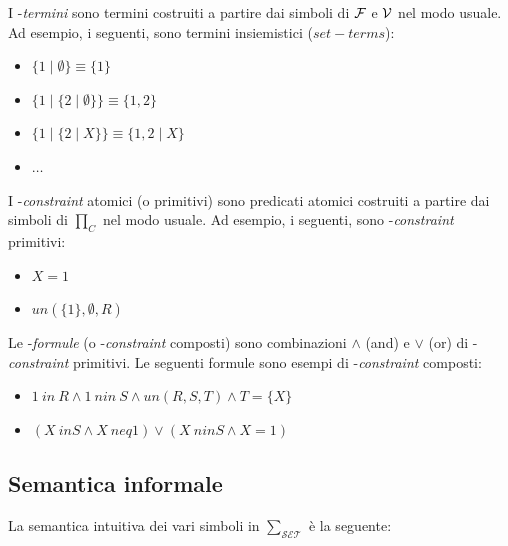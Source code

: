 \documentclass[12pt,a4paper,openright]{book} %
\begin{document}
I \calset{}-\textit{termini} sono termini costruiti a partire dai
simboli di $\mathcal{F}$ e $\mathcal{V}$ nel modo usuale. Ad esempio, i seguenti,
sono termini insiemistici ($set-terms$):
\begin{itemize}
	\item $\{1 \mid \emptyset \} \equiv \{1\}$
	\item $\{1 \mid \{2 \mid \emptyset \} \} \equiv \{1,2\}$
	\item $\{1 \mid \{2 \mid X \} \} \equiv \{1,2 \mid X \}$
	\item $\ldots$
\end{itemize}

I \calset{}-\textit{constraint} atomici (o primitivi) sono predicati
atomici costruiti a partire dai simboli di $\prod_C$ nel modo
usuale. Ad esempio, i seguenti, sono \calset{}-\textit{constraint}
primitivi:
\begin{itemize}
	\item $X = 1$
	\item $un(\{1\}, \emptyset, R)$
\end{itemize}

Le \calset{}-\textit{formule} (o \calset{}-\textit{constraint}
composti) sono combinazioni $\wedge$ (and) e $\vee$ (or) di
\calset{}-\textit{constraint} primitivi. Le seguenti formule sono
esempi di \calset{}-\textit{constraint} composti:
\begin{itemize}
	\item $1\ in\ R \land 1\ nin\ S \land un(R,S,T) \land T = \{X\}$
	\item $(X\ in S \land X\ neq 1) \lor (X\ nin S \land X = 1)$
\end{itemize}

\subsection{Semantica informale}
\label{subsec:clpbasedlang_lset_semantics}

La semantica intuitiva dei vari simboli in $\sum_{\mathcal{SET}}$ è la seguente:
\end{document}
